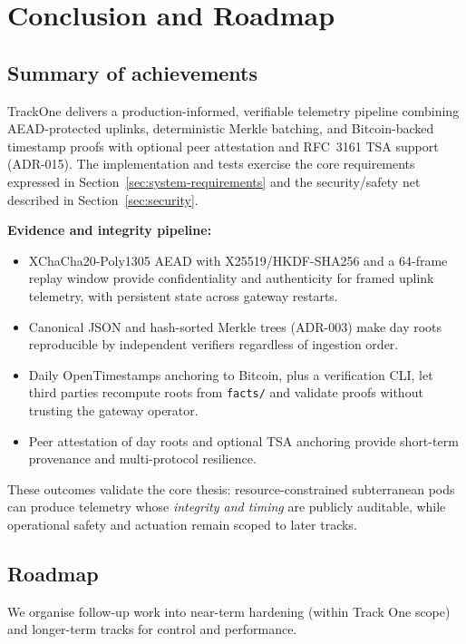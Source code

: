 \section{Conclusion and Roadmap}
\label{sec:conclusion}

\subsection{Summary of achievements}
\label{subsec:achievements}

TrackOne delivers a production-informed, verifiable telemetry pipeline combining \ac{AEAD}-protected uplinks, deterministic Merkle batching, and Bitcoin-backed timestamp proofs with optional peer attestation and \ac{RFC}~3161 \ac{TSA} support (\ac{ADR}-015).
The implementation and tests exercise the core requirements expressed in Section~\ref{sec:system-requirements} and the security/safety net described in Section~\ref{sec:security}.

\textbf{Evidence and integrity pipeline:}
\begin{itemize}[nosep]
    \item XChaCha20-Poly1305 \ac{AEAD} with X25519/\ac{HKDF}-\ac{SHA}256 and a 64-frame replay window provide confidentiality and authenticity for framed uplink telemetry, with persistent state across gateway restarts.
    \item Canonical \ac{JSON} and hash-sorted Merkle trees (\ac{ADR}-003) make day roots reproducible by independent verifiers regardless of ingestion order.
    \item Daily OpenTimestamps anchoring to Bitcoin, plus a verification \ac{CLI}, let third parties recompute roots from \texttt{facts/} and validate proofs without trusting the gateway operator.
    \item Peer attestation of day roots and optional \ac{TSA} anchoring provide short-term provenance and multi-protocol resilience.
\end{itemize}

These outcomes validate the core thesis: resource-constrained subterranean pods can produce telemetry whose \emph{integrity and timing} are publicly auditable, while operational safety and actuation remain scoped to later tracks.

\subsection{Roadmap}
\label{subsec:roadmap}

We organise follow-up work into near-term hardening (within Track One scope) and longer-term tracks for control and performance.

